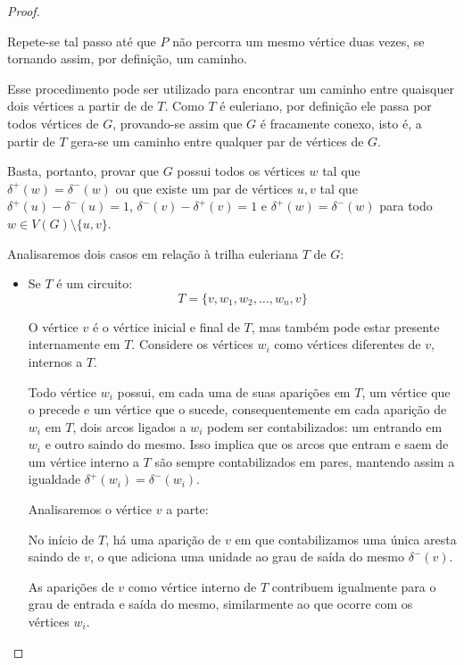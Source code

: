 \begin{proof}
\begin{tcolorbox}
            Repete-se tal passo até que $P$ não percorra um mesmo vértice duas vezes, se tornando assim, por definição, um caminho.

        \end{tcolorbox}
    
    Esse procedimento pode ser utilizado para encontrar um caminho entre quaisquer dois vértices a partir de de $T$. 
    Como $T$ é euleriano, por definição ele passa por todos vértices de $G$, provando-se assim que $G$ é fracamente conexo, isto é, a partir de $T$ gera-se um caminho entre qualquer par de vértices de $G$. 

     Basta, portanto, provar que $G$ possui todos os vértices $w$ tal que $\delta^+(w) = \delta^-(w)$ ou que existe um par de vértices $u, v$ tal que $\delta^+(u) - \delta^-(u) = 1$, $\delta^-(v) - \delta^+(v) = 1$ e $\delta^+(w) = \delta^-(w)$ para todo $w \in V(G)\setminus \{u, v\}$.

    Analisaremos dois casos em relação à trilha euleriana $T$ de $G$:

    \begin{itemize}
        \item Se $T$ é um circuito:
            \[
                T  = \{v, w_1, w_2, \dots, w_n, v\}
            \]

            O vértice $v$ é o vértice inicial e final de $T$, mas também pode estar presente internamente em $T$. 
            Considere os vértices $w_i$ como vértices diferentes de $v$, internos a $T$.

            Todo vértice $w_i$ possui, em cada uma de suas aparições em $T$, um vértice que o precede e um vértice que o sucede, consequentemente em cada aparição de $w_i$ em $T$, dois arcos ligados a $w_i$ podem ser contabilizados: um entrando em $w_i$ e outro saindo do mesmo. 
            Isso implica que os arcos que entram e saem de um vértice interno a $T$ são sempre contabilizados em pares, mantendo assim a igualdade $\delta^+(w_i) = \delta^-(w_i)$.

            Analisaremos o vértice $v$ a parte:

            No início de $T$, há uma aparição de $v$ em que contabilizamos uma única aresta saindo de $v$, o que adiciona uma unidade ao grau de saída do mesmo $\delta^-(v)$.

            As aparições de $v$ como vértice interno de $T$ contribuem igualmente para o grau de entrada e saída do mesmo, similarmente ao que ocorre com os vértices $w_i$.


\end{itemize}
\end{proof}
